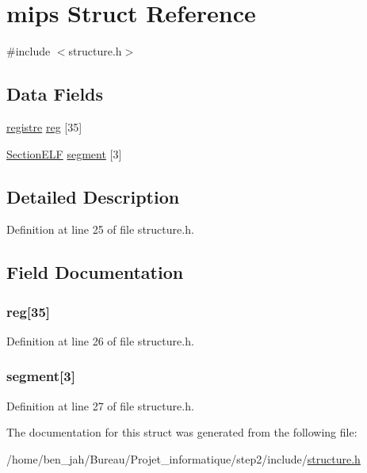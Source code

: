 \hypertarget{structmips}{\section{mips \-Struct \-Reference}
\label{structmips}
}


{\ttfamily \#include $<$structure.\-h$>$}

\subsection*{\-Data \-Fields}
\begin{DoxyCompactItemize}
\item 
\hyperlink{structregistre}{registre} \hyperlink{structmips_a850f3c5ce0558bc004d3bafaffd48e02}{reg} \mbox{[}35\mbox{]}
\item 
\hyperlink{struct_section_e_l_f}{\-Section\-E\-L\-F} \hyperlink{structmips_ac97d3180762159eaebcc9b03ecba57c3}{segment} \mbox{[}3\mbox{]}
\end{DoxyCompactItemize}


\subsection{\-Detailed \-Description}


\-Definition at line 25 of file structure.\-h.



\subsection{\-Field \-Documentation}
\hypertarget{structmips_a850f3c5ce0558bc004d3bafaffd48e02}{
\subsubsection[{reg}]{ {\bf reg}\mbox{[}35\mbox{]}}}\label{structmips_a850f3c5ce0558bc004d3bafaffd48e02}


\-Definition at line 26 of file structure.\-h.

\hypertarget{structmips_ac97d3180762159eaebcc9b03ecba57c3}{
\subsubsection[{segment}]{ {\bf segment}\mbox{[}3\mbox{]}}}\label{structmips_ac97d3180762159eaebcc9b03ecba57c3}


\-Definition at line 27 of file structure.\-h.



\-The documentation for this struct was generated from the following file\-:\begin{DoxyCompactItemize}
\item 
/home/ben\-\_\-jah/\-Bureau/\-Projet\-\_\-informatique/step2/include/\hyperlink{structure_8h}{structure.\-h}\end{DoxyCompactItemize}
